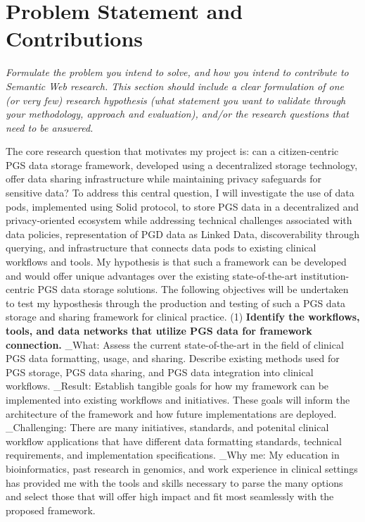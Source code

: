 \documentclass{article}
\begin{document}
\section{Problem Statement and Contributions}
\textit{Formulate the problem you intend to solve, and how you intend to contribute to Semantic Web research. This section should include a clear formulation of one (or very few) research hypothesis (what statement you want to validate through your methodology, approach and evaluation), and/or the research questions that need to be answered.}

The core research question that motivates my project is: can a citizen-centric PGS data storage framework, developed using a decentralized storage technology, offer data sharing infrastructure while maintaining privacy safeguards for sensitive data? 
To address this central question, I will investigate the use of data pods, implemented using Solid protocol, to store PGS data in a decentralized and privacy-oriented ecosystem while addressing technical challenges associated with data policies, representation of PGD data as Linked Data, discoverability through querying, and infrastructure that connects data pods to existing clinical workflows and tools. 
My hypothesis is that such a framework can be developed and would offer unique advantages over the existing state-of-the-art institution-centric PGS data storage solutions. 
The following objectives will be undertaken to test my hyposthesis through the production and testing of such a PGS data storage and sharing framework for clinical practice.
(1) \textbf{Identify the workflows, tools, and data networks that utilize PGS data for framework connection.}
_What: Assess the current state-of-the-art in the field of clinical PGS data formatting, usage, and sharing. 
Describe existing methods used for PGS storage, PGS data sharing, and PGS data integration into clinical workflows.
_Result: Establish tangible goals for how my framework can be implemented into existing workflows and initiatives. These goals will inform the architecture of the framework and how future implementations are deployed. 
_Challenging: There are many initiatives, standards, and potenital clinical workflow applications that have different data formatting standards, technical requirements, and implementation specifications. 
_Why me: My education in bioinformatics, past research in genomics, and work experience in clinical settings has provided me with the tools and skills necessary to parse the many options and select those that will offer high impact and fit most seamlessly with the proposed framework.
\end{document}
